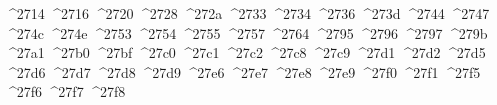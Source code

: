 {  ^^^^2714%
  ^^^^2716%
  ^^^^2720%
  ^^^^2728%
  ^^^^272a%
  ^^^^2733%
  ^^^^2734%
  ^^^^2736%
  ^^^^273d%
  ^^^^2744%
  ^^^^2747%
  ^^^^274c%
  ^^^^274e%
  ^^^^2753%
  ^^^^2754%
  ^^^^2755%
  ^^^^2757%
  ^^^^2764%
  ^^^^2795%
  ^^^^2796%
  ^^^^2797%
  ^^^^279b%
  ^^^^27a1%
  ^^^^27b0%
  ^^^^27bf%
  ^^^^27c0%
  ^^^^27c1%
  ^^^^27c2%
  ^^^^27c8%
  ^^^^27c9%
  ^^^^27d1%
  ^^^^27d2%
  ^^^^27d5%
  ^^^^27d6%
  ^^^^27d7%
  ^^^^27d8%
  ^^^^27d9%
  ^^^^27e6%
  ^^^^27e7%
  ^^^^27e8%
  ^^^^27e9%
  ^^^^27f0%
  ^^^^27f1%
  ^^^^27f5%
  ^^^^27f6%
  ^^^^27f7%
  ^^^^27f8%
}
